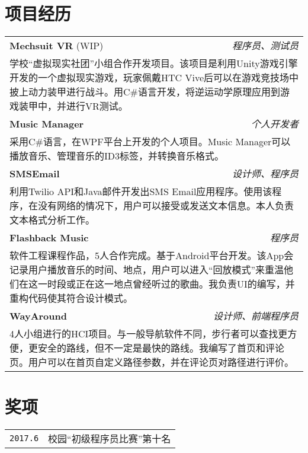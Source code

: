 \documentclass[UTF8]{ctexart}
\begin{document}
	\section{项目经历}
	\smallskip
	\noindent
	\begin{tabular}{l r}	
		\textbf{\large Mechsuit VR} {\small (WIP)} & \textit{程序员、测试员} \\
		\multicolumn{2}{p{\linewidth}}{学校“虚拟现实社团”小组合作开发项目。该项目是利用Unity游戏引擎开发的一个虚拟现实游戏，玩家佩戴HTC Vive后可以在游戏竞技场中披上动力装甲进行战斗。用C\#语言开发，将逆运动学原理应用到游戏装甲中，并进行VR测试。} \\
		\textbf{\large Music Manager} & \textit{个人开发者} \\
		\multicolumn{2}{p{\linewidth}}{采用C\#语言，在WPF平台上开发的个人项目。Music Manager可以播放音乐、管理音乐的ID3标签，并转换音乐格式。} \\
		\textbf{\large SMSEmail} & \textit{设计师、程序员} \\
		\multicolumn{2}{p{\linewidth}}{利用Twilio API和Java邮件开发出SMS Email应用程序。使用该程序，在没有网络的情况下，用户可以接受或发送文本信息。本人负责文本格式分析工作。} \\
		\textbf{\large Flashback Music} & \textit{程序员} \\
		\multicolumn{2}{p{\linewidth}}{软件工程课程作品，5人合作完成。基于Android平台开发。该App会记录用户播放音乐的时间、地点，用户可以进入“回放模式”来重温他们在这一时段或正在这一地点曾经听过的歌曲。我负责UI的编写，并重构代码使其符合设计模式。} \\
		\textbf{\large WayAround} & \textit{设计师、前端程序员} \\
		\multicolumn{2}{p{\linewidth}}{4人小组进行的HCI项目。与一般导航软件不同，步行者可以查找更方便，更安全的路线，但不一定是最快的路线。我编写了首页和评论页。用户可以在首页自定义路径参数，并在评论页对路径进行评价。} \\
	\end{tabular}
	
	\smallskip
	
	\section{奖项}
	\smallskip
	\noindent
	\begin{tabularx}{\linewidth}{r | X}
		\texttt{2017.6} & 校园“初级程序员比赛”第十名
	\end{tabularx}
	
	\smallskip
	
\end{document}
